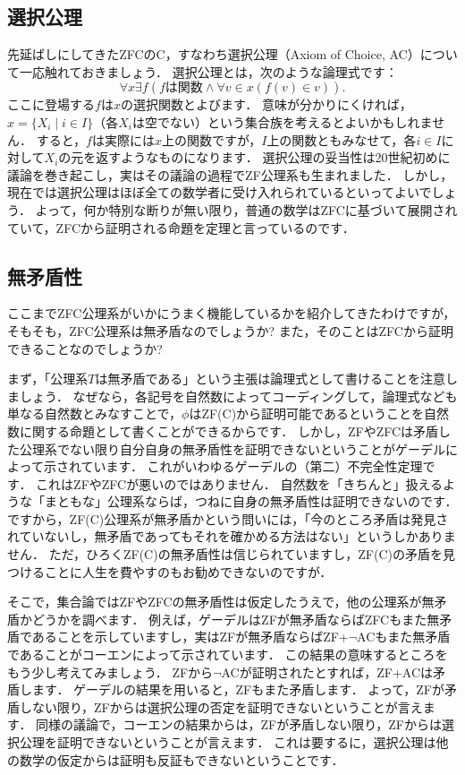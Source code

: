 \documentclass[./main]{subfiles}
\begin{document}
\subsection{選択公理}

先延ばしにしてきたZFCのC，すなわち選択公理（Axiom of Choice, AC）について一応触れておきましょう．
選択公理とは，次のような論理式です：
\[
\forall x\exists f(f\text{は関数}\land\forall v\in x(f(v)\in v)).
\]
ここに登場する$f$は$x$の選択関数とよびます．
意味が分かりにくければ，$x=\{X_i \mid i\in I\}$（各$X_i$は空でない）という集合族を考えるとよいかもしれません．
すると，$f$は実際には$x$上の関数ですが，$I$上の関数ともみなせて，各$i\in I$に対して$X_i$の元を返すようなものになります．
選択公理の妥当性は20世紀初めに議論を巻き起こし，実はその議論の過程でZF公理系も生まれました．
しかし，現在では選択公理はほぼ全ての数学者に受け入れられているといってよいでしょう．
よって，何か特別な断りが無い限り，普通の数学はZFCに基づいて展開されていて，ZFCから証明される命題を定理と言っているのです．

\subsection{無矛盾性}

ここまでZFC公理系がいかにうまく機能しているかを紹介してきたわけですが，そもそも，ZFC公理系は無矛盾なのでしょうか?
また，そのことはZFCから証明できることなのでしょうか?

まず，「公理系$T$は無矛盾である」という主張は論理式として書けることを注意しましょう．
なぜなら，各記号を自然数によってコーディングして，論理式なども単なる自然数とみなすことで，$\phi$はZF(C)から証明可能であるということを自然数に関する命題として書くことができるからです．
しかし，ZFやZFCは矛盾した公理系でない限り自分自身の無矛盾性を証明できないということがゲーデルによって示されています．
これがいわゆるゲーデルの（第二）不完全性定理です．
これはZFやZFCが悪いのではありません．
自然数を「きちんと」扱えるような「まともな」公理系ならば，つねに自身の無矛盾性は証明できないのです．
ですから，ZF(C)公理系が無矛盾かという問いには，「今のところ矛盾は発見されていないし，無矛盾であってもそれを確かめる方法はない」というしかありません．
ただ，ひろくZF(C)の無矛盾性は信じられていますし，ZF(C)の矛盾を見つけることに人生を費やすのもお勧めできないのですが．

そこで，集合論ではZFやZFCの無矛盾性は仮定したうえで，他の公理系が無矛盾かどうかを調べます．
例えば，ゲーデルはZFが無矛盾ならばZFCもまた無矛盾であることを示していますし，実はZFが無矛盾ならばZF+$\neg$ACもまた無矛盾であることがコーエンによって示されています．
この結果の意味するところをもう少し考えてみましょう．
ZFから$\neg$ACが証明されたとすれば，ZF+ACは矛盾します．
ゲーデルの結果を用いると，ZFもまた矛盾します．
よって，ZFが矛盾しない限り，ZFからは選択公理の否定を証明できないということが言えます．
同様の議論で，コーエンの結果からは，ZFが矛盾しない限り，ZFからは選択公理を証明できないということが言えます．
これは要するに，選択公理は他の数学の仮定からは証明も反証もできないということです．
\end{document}
